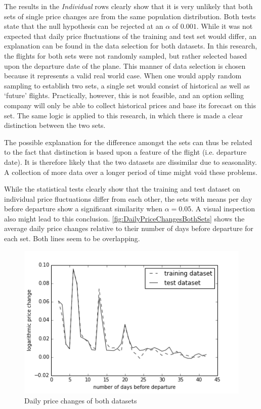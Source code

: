 The results in the \emph{Individual} rows clearly show that it is very unlikely that both sets of single price changes are from the same population distribution. Both tests state that the null hypothesis can be rejected at an $\alpha$ of $0.001$. While it was not expected that daily price fluctuations of the training and test set would differ, an explanation can be found in the data selection for both datasets. In this research, the flights for both sets were not randomly sampled, but rather selected based upon the departure date of the plane. This manner of data selection is chosen because it represents a valid real world case. When one would apply random sampling to establish two sets, a single set would consist of historical as well as `future' flights. Practically, however, this is not feasible, and an option selling company will only be able to collect historical prices and base its forecast on this set. The same logic is applied to this research, in which there is made a clear distinction between the two sets.

The possible explanation for the difference amongst the sets can thus be related to the fact that distinction is based upon a feature of the flight (i.e. departure date). It is therefore likely that the two datasets are dissimilar due to seasonality. A collection of more data over a longer period of time might void these problems.

While the statistical tests clearly show that the training and test dataset on individual price fluctuations differ from each other, the sets with means per day before departure show a significant similarity when $\alpha = 0.05$. A visual inspection also might lead to this conclusion. \autoref{fig:DailyPriceChangesBothSets} shows the average daily price changes relative to their number of days before departure for each set. Both lines seem to be overlapping.


\begin{figure}
\centering
\includegraphics[width=.8\textwidth]{figures/Train-Test_DailyReturns}
\caption{Daily price changes of both datasets}
\label{fig:DailyPriceChangesBothSets}
\end{figure}


